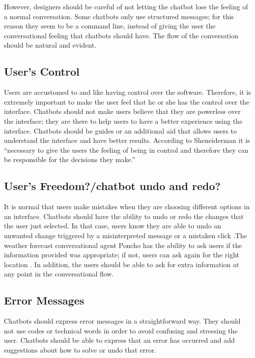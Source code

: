 \documentclass[a4paper,10pt]{article}
\begin{document}
However, designers should be careful of not letting the chatbot lose the feeling of a normal conversation. Some chatbots only use structured messages; for this reason they seem to be a command line, instead of giving the user the conversational feeling that chatbots should have. The flow of the conversation should be natural and evident. 


\subsection*{User's Control}

Users are accustomed to and like having control over the software. Therefore, it is extremely important to make the user feel that he or she has the control over the interface. Chatbots should not make users believe that they are powerless over the interface; they are there to help users to have a better experience using the interface. Chatbots should be guides or an additional aid that allows users to understand the interface and have better results. According to Sheneiderman \cite{shneiderman1997direct} it is ``necessary to give the users the feeling of being in control and therefore they can be responsible for the decisions they make.” 

\subsection*{User's Freedom?/chatbot undo and redo? }

It is normal that users make mistakes when they are choosing different options in an interface. Chatbots should have the ability to undo or redo the changes that the user just selected. In that case, users know they are able to undo an unwanted change triggered by a misinterpreted message or a mistaken click \cite{HeuristicsWebPage}.The weather forecast conversational agent Poncho has the ability to ask users if the information provided was appropriate; if not, users can ask again for the right location \cite{poncho2017}. In addition, the users should be able to ask for extra information at any point in the conversational flow.

\subsection*{Error Messages}

Chatbots should express error messages in a straightforward way. They should not use codes or technical words in order to avoid confusing and stressing the user. Chatbots should be able to express that an error has occurred and add suggestions about how to solve or undo that error. 
\end{document}

